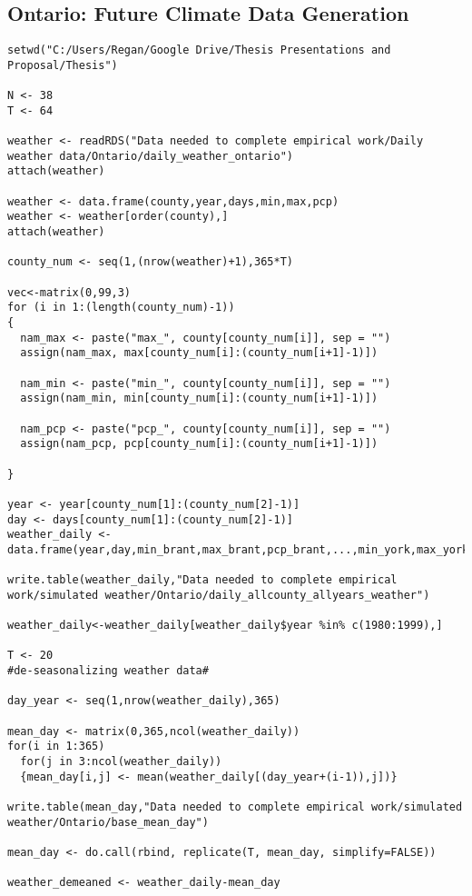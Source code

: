 \subsection{Ontario: Future Climate Data Generation}

\begin{lstlisting}
setwd("C:/Users/Regan/Google Drive/Thesis Presentations and Proposal/Thesis")

N <- 38
T <- 64

weather <- readRDS("Data needed to complete empirical work/Daily weather data/Ontario/daily_weather_ontario")
attach(weather)

weather <- data.frame(county,year,days,min,max,pcp)
weather <- weather[order(county),]
attach(weather)

county_num <- seq(1,(nrow(weather)+1),365*T)

vec<-matrix(0,99,3)
for (i in 1:(length(county_num)-1))
{
  nam_max <- paste("max_", county[county_num[i]], sep = "")
  assign(nam_max, max[county_num[i]:(county_num[i+1]-1)])
  
  nam_min <- paste("min_", county[county_num[i]], sep = "")
  assign(nam_min, min[county_num[i]:(county_num[i+1]-1)])
  
  nam_pcp <- paste("pcp_", county[county_num[i]], sep = "")
  assign(nam_pcp, pcp[county_num[i]:(county_num[i+1]-1)])
 
}

year <- year[county_num[1]:(county_num[2]-1)]
day <- days[county_num[1]:(county_num[2]-1)]
weather_daily <- data.frame(year,day,min_brant,max_brant,pcp_brant,...,min_york,max_york,pcp_york)

write.table(weather_daily,"Data needed to complete empirical work/simulated weather/Ontario/daily_allcounty_allyears_weather")

weather_daily<-weather_daily[weather_daily$year %in% c(1980:1999),]

T <- 20
#de-seasonalizing weather data#

day_year <- seq(1,nrow(weather_daily),365)

mean_day <- matrix(0,365,ncol(weather_daily))
for(i in 1:365)
  for(j in 3:ncol(weather_daily))
  {mean_day[i,j] <- mean(weather_daily[(day_year+(i-1)),j])}

write.table(mean_day,"Data needed to complete empirical work/simulated weather/Ontario/base_mean_day")

mean_day <- do.call(rbind, replicate(T, mean_day, simplify=FALSE))

weather_demeaned <- weather_daily-mean_day


\end{lstlisting}
